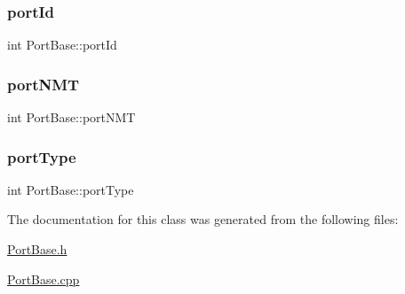 \subsubsection{\texorpdfstring{port\+Id}{portId}}
{\footnotesize\ttfamily int Port\+Base\+::port\+Id\hspace{0.3cm}{\ttfamily [protected]}}

\mbox{\label{classPortBase_ae63f6df54bbeac1046b5dfbe178e1cee}} 
\subsubsection{\texorpdfstring{port\+N\+MT}{portNMT}}
{\footnotesize\ttfamily int Port\+Base\+::port\+N\+MT\hspace{0.3cm}{\ttfamily [protected]}}

\mbox{\label{classPortBase_a6f18d480ef41a91fd2957927fe94c408}} 
\subsubsection{\texorpdfstring{port\+Type}{portType}}
{\footnotesize\ttfamily int Port\+Base\+::port\+Type\hspace{0.3cm}{\ttfamily [protected]}}



The documentation for this class was generated from the following files\+:\begin{DoxyCompactItemize}
\item 
\hyperlink{PortBase_8h}{Port\+Base.\+h}\item 
\hyperlink{PortBase_8cpp}{Port\+Base.\+cpp}\end{DoxyCompactItemize}
